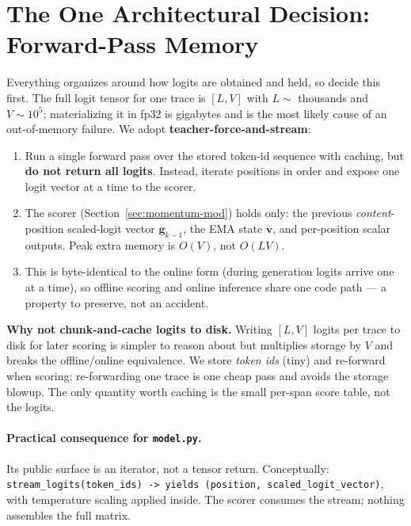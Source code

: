 \documentclass[11pt]{article}
\newcommand{\modu}[1]{\texttt{#1}}
\newcommand{\fn}[1]{\texttt{#1}}
\begin{document}
\section{The One Architectural Decision: Forward-Pass Memory}
\label{sec:memory}

Everything organizes around how logits are obtained and held, so decide this first. The full logit tensor for one trace is $[L, V]$ with $L\sim$ thousands and $V\sim 10^5$; materializing it in fp32 is gigabytes and is the most likely cause of an out-of-memory failure. We adopt \textbf{teacher-force-and-stream}:

\begin{enumerate}[leftmargin=1.7em]
  \item Run a single forward pass over the stored token-id sequence with caching, but \textbf{do not return all logits}. Instead, iterate positions in order and expose one logit vector at a time to the scorer.
  \item The scorer (Section~\ref{sec:momentum-mod}) holds only: the previous \emph{content}-position scaled-logit vector $\bm{g}_{k-1}$, the EMA state $\bar{\bm{v}}$, and per-position scalar outputs. Peak extra memory is $O(V)$, not $O(LV)$.
  \item This is byte-identical to the online form (during generation logits arrive one at a time), so offline scoring and online inference share one code path --- a property to preserve, not an accident.
\end{enumerate}

\begin{notebox}
\textbf{Why not chunk-and-cache logits to disk.} Writing $[L,V]$ logits per trace to disk for later scoring is simpler to reason about but multiplies storage by $V$ and breaks the offline/online equivalence. We store \emph{token ids} (tiny) and re-forward when scoring; re-forwarding one trace is one cheap pass and avoids the storage blowup. The only quantity worth caching is the small per-span score table, not the logits.
\end{notebox}

\paragraph{Practical consequence for \modu{model.py}.} Its public surface is an iterator, not a tensor return. Conceptually: \fn{stream\_logits(token\_ids) -> yields (position, scaled\_logit\_vector)}, with temperature scaling applied inside. The scorer consumes the stream; nothing assembles the full matrix.
\end{document}

